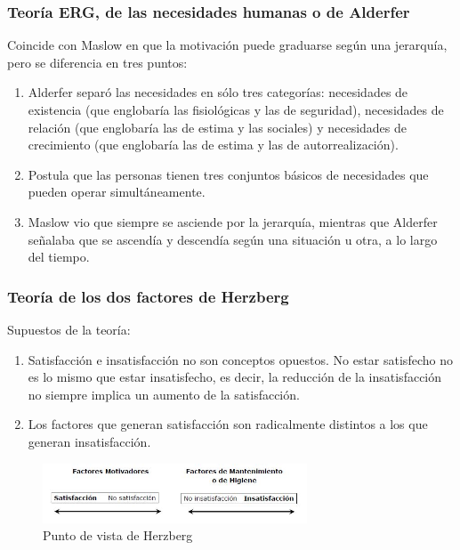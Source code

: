 \documentclass[12pt]{article}
\theoremstyle{definition_wo_parentheses}
\begin{document}
\subsubsection{Teoría ERG, de las necesidades humanas o de Alderfer}
Coincide con Maslow en que la motivación puede graduarse según una jerarquía, pero se diferencia en tres puntos:
\begin{enumerate}
\item Alderfer separó las necesidades en sólo tres categorías: necesidades de existencia (que englobaría las fisiológicas y las de seguridad), necesidades de relación (que englobaría las de estima y las sociales) y necesidades de crecimiento (que englobaría las de estima y las de autorrealización).
\item Postula que las personas tienen tres conjuntos básicos de necesidades que pueden operar simultáneamente.
\item Maslow vio que siempre se asciende por la jerarquía, mientras que Alderfer señalaba que se ascendía y descendía según una situación u otra, a lo largo del tiempo.
\end{enumerate}

\subsubsection{Teoría de los dos factores de Herzberg}
Supuestos de la teoría:
\begin{enumerate}
\item Satisfacción e insatisfacción no son conceptos opuestos. No estar satisfecho no es lo mismo que estar insatisfecho, es decir, la reducción de la insatisfacción no siempre implica un aumento de la satisfacción.
\item Los factores que generan satisfacción son radicalmente distintos a los que generan insatisfacción.
\end{enumerate}

\begin{figure}[H]
\centering
\includegraphics[width=0.7\textwidth]{herzberg}
\caption{Punto de vista de Herzberg}
\label{fig:herzberg}
\end{figure}
\end{document}
